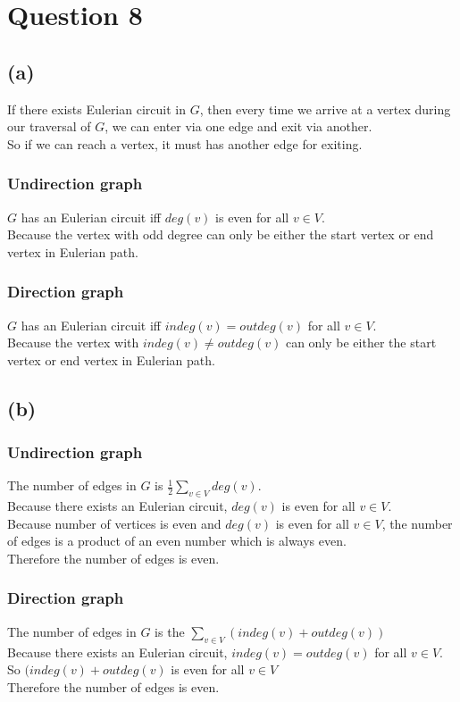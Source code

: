 \documentclass{article} %
\begin{document}
\section*{Question 8}
\subsection*{(a)}
If there exists Eulerian circuit in $G$, then every time we arrive at a vertex during our traversal of $G$, we can enter via one edge and exit via another.\\
So if we can reach a vertex, it must has another edge for exiting.\\
\subsubsection*{Undirection graph}
$G$ has an Eulerian circuit iff $deg(v)$ is even for all $v \in V$. \\
Because the vertex with odd degree can only be either the start vertex or end vertex in Eulerian path.\\
\subsubsection*{Direction graph}
$G$ has an Eulerian circuit iff $indeg(v) = outdeg(v)$ for all $v\in V$.\\
Because the vertex with $indeg(v) \neq outdeg(v)$ can only be either the start vertex or end vertex in Eulerian path.\\
\subsection*{(b)}
\subsubsection*{Undirection graph}
The number of edges in $G$ is $\frac{1}{2} \sum_{v\in V}deg(v)$.\\
Because there exists an Eulerian circuit, $deg(v)$ is even for all $v \in V$.\\
Because number of vertices is even and $deg(v)$ is even for all $v \in V$, the number of edges is a product of an even number which is always even.\\
Therefore the number of edges is even.
\subsubsection*{Direction graph}
The number of edges in $G$ is the $\sum_{v\in V}(indeg(v) + outdeg(v))$\\
Because there exists an Eulerian circuit, $indeg(v) = outdeg(v)$ for all $v\in V$.\\
So $(indeg(v) + outdeg(v)$ is even for all $v \in V$\\
Therefore the number of edges is even.
\end{document}
